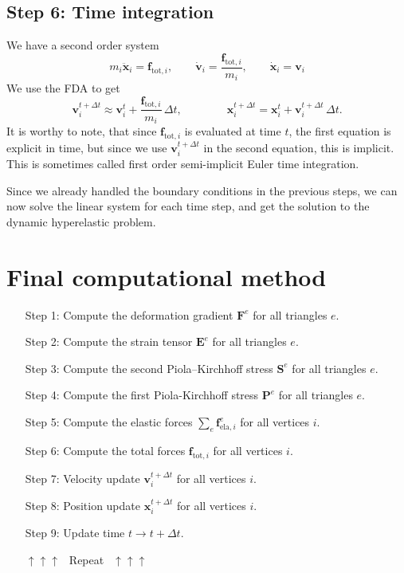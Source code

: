 \documentclass[acmtog]{acmart}
\begin{document}
\subsection*{Step 6: Time integration}
We have a second order system
%
\begin{equation}
  m_i \ddot{\boldsymbol x}_i = \boldsymbol f_{\mathrm{tot},i}, \qquad \dot{\boldsymbol v}_i = \frac{\boldsymbol f_{\mathrm{tot},i}}{m_i}, \qquad \dot{\boldsymbol x}_i = \boldsymbol v_i
\end{equation}
%
We use the FDA to get
%
\begin{equation}
  \boldsymbol v_i^{t + \Delta t} \approx \boldsymbol v_i^t + \frac{\boldsymbol f_{\mathrm{tot}, i}}{m_i} \,\Delta t, \qquad \qquad
  \boldsymbol x_i^{t+ \Delta t} = \boldsymbol x_i^t + \boldsymbol v_i^{t+\Delta t} \,\Delta t.
\end{equation}
%
It is worthy to note, that since $\boldsymbol f_{\mathrm{tot}, i}$ is evaluated at time $t$, the first equation is explicit in time, but since we use $\boldsymbol v_i^{t + \Delta t}$ in the second equation, this is implicit. This is sometimes called first order semi-implicit Euler time integration.

Since we already handled the boundary conditions in the previous steps, we can now solve the linear system for each time step, and get the solution to the dynamic hyperelastic problem.

\section{Final computational method}
\begin{itemize}
  \item[Step 1:] Compute the deformation gradient $\boldsymbol F^e$ for all triangles $e$.
  \item[Step 2:] Compute the strain tensor $\boldsymbol E^e$ for all triangles $e$.
  \item[Step 3:] Compute the second Piola–Kirchhoff stress $\boldsymbol S^e$ for all triangles $e$.
  \item[Step 4:] Compute the first Piola-Kirchhoff stress $\boldsymbol P^e$ for all triangles $e$.
  \item[Step 5:] Compute the elastic forces $\sum_e\boldsymbol f_{\mathrm{ela},i}^e$ for all vertices $i$.
  \item[Step 6:] Compute the total forces $\boldsymbol f_{\mathrm{tot}, i}$ for all vertices $i$.
  \item[Step 7:] Velocity update $\boldsymbol v_i^{t+\Delta t}$ for all vertices $i$.
  \item[Step 8:] Position update $\boldsymbol x_i^{t + \Delta t}$ for all vertices $i$.
  \item[Step 9:] Update time $t \to t + \Delta t$.
  \item[] $\uparrow$$\uparrow$$\uparrow \ \ $ Repeat $\ \ \uparrow$$\uparrow$$\uparrow$
\end{itemize}
\end{document}
